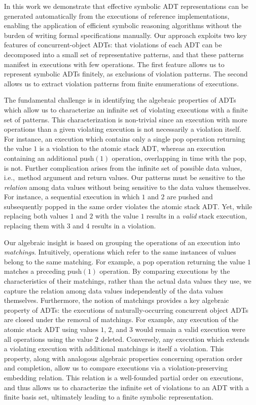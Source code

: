 In this work we demonstrate that effective symbolic ADT representations can be
generated automatically from the executions of reference implementations,
enabling the application of efficient symbolic reasoning algorithms
without the burden of writing formal specifications manually. Our approach
exploits two key features of concurrent-object ADTs: that violations of each
ADT can be decomposed into a small set of representative patterns, and that
these patterns manifest in executions with few operations. The first feature
allows us to represent symbolic ADTs finitely, as exclusions of violation
patterns. The second allows us to extract violation patterns from finite
enumerations of executions.

The fundamental challenge is in identifying the algebraic properties of ADTs
which allow us to characterize an infinite set of violating executions with a
finite set of patterns. This characterization is non-trivial since an execution
with more operations than a given violating execution is not necessarily a
violation itself. For instance, an execution which contains only a single
pop operation returning the value $1$ is a violation to the atomic stack
ADT, whereas an execution containing an additional push$(1)$ operation,
overlapping in time with the pop, is not. Further complication arises
from the infinite set of possible data values, i.e.,~method argument and return
values. Our patterns must be sensitive to the \emph{relation} among data values
without being sensitive to the data values themselves. For instance, a
sequential execution in which $1$ and $2$ are pushed and subsequently
popped in the same order violates the atomic stack ADT. Yet, while replacing
both values $1$ and $2$ with the value $1$ results in a
\emph{valid} stack execution, replacing them with $3$ and $4$ results
in a violation.

Our algebraic insight is based on grouping the operations of an execution into
\emph{matchings}. Intuitively, operations which refer to the same instances of
values belong to the same matching. For example, a pop operation
returning the value $1$ matches a preceding push$(1)$ operation. By
comparing executions by the characteristics of their matchings, rather than the
actual data values they use, we capture the relation among data values
independently of the data values themselves. Furthermore, the notion of
matchings provides a key algebraic property of ADTs: the executions of
naturally-occurring concurrent object ADTs are closed under the removal of
matchings. For example, any execution of the atomic stack ADT using values
$1$, $2$, and $3$ would remain a valid execution were all operations
using the value $2$ deleted. Conversely, any execution which extends a
violating execution with additional matchings is itself a violation. This
property, along with analogous algebraic properties concerning operation order
and completion, allow us to compare executions via a violation-preserving
embedding relation. This relation is a well-founded partial order on
executions, and thus allows us to characterize the infinite set of violations
to an ADT with a finite basis set, ultimately leading to a finite symbolic
representation.

